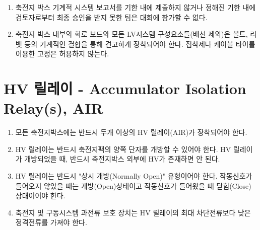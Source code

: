 \documentclass[final,a4paper,10pt]{report}
\begin{document}
\begin{enumerate}
  \item 축전지 박스 기계적 시스템 보고서를 기한 내에 제출하지 않거나 정해진 기한 내에 검토자로부터 최종 승인을 받지 못한 팀은 대회에 참가할 수 없다.
  \item 축전지 박스 내부의 회로 보드와 모든 LV시스템 구성요소들(배선 제외)은 볼트, 리벳 등의 기계적인 결합을 통해 견고하게 장착되어야 한다. 접착제나 케이블 타이를 이용한 고정은 허용하지 않는다.
\end{enumerate}

\section{HV 릴레이 - Accumulator Isolation Relay(s), AIR} \label{section:AIR}
\begin{enumerate}
  \item 모든 축전지박스에는 반드시 두개 이상의 HV 릴레이(AIR)가 장착되어야 한다.
  \item HV 릴레이는 반드시 축전지팩의 양쪽 단자를 개방할 수 있어야 한다. HV 릴레이가 개방되었을 때, 반드시 축전지박스 외부에 HV가 존재하면 안 된다. \label{item:AIR 개방}
  \item HV 릴레이는 반드시 "상시 개방(Normally Open)" 유형이어야 한다. 작동신호가 들어오지 않았을 때는 개방(Open)상태이고 작동신호가 들어왔을 때 닫힘(Close) 상태이어야 한다.
  \item 축전지 및 구동시스템 과전류 보호 장치는 HV 릴레이의 최대 차단전류보다 낮은 정격전류를 가져야 한다.
\end{enumerate}
\end{document}
